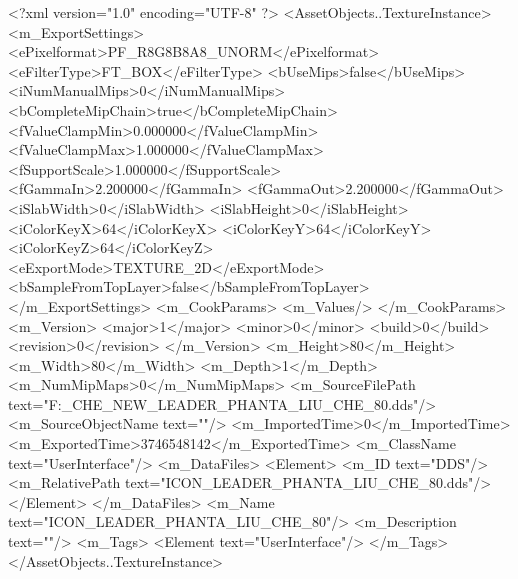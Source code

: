 <?xml version="1.0" encoding="UTF-8" ?>
<AssetObjects..TextureInstance>
	<m_ExportSettings>
		<ePixelformat>PF_R8G8B8A8_UNORM</ePixelformat>
		<eFilterType>FT_BOX</eFilterType>
		<bUseMips>false</bUseMips>
		<iNumManualMips>0</iNumManualMips>
		<bCompleteMipChain>true</bCompleteMipChain>
		<fValueClampMin>0.000000</fValueClampMin>
		<fValueClampMax>1.000000</fValueClampMax>
		<fSupportScale>1.000000</fSupportScale>
		<fGammaIn>2.200000</fGammaIn>
		<fGammaOut>2.200000</fGammaOut>
		<iSlabWidth>0</iSlabWidth>
		<iSlabHeight>0</iSlabHeight>
		<iColorKeyX>64</iColorKeyX>
		<iColorKeyY>64</iColorKeyY>
		<iColorKeyZ>64</iColorKeyZ>
		<eExportMode>TEXTURE_2D</eExportMode>
		<bSampleFromTopLayer>false</bSampleFromTopLayer>
	</m_ExportSettings>
	<m_CookParams>
		<m_Values/>
	</m_CookParams>
	<m_Version>
		<major>1</major>
		<minor>0</minor>
		<build>0</build>
		<revision>0</revision>
	</m_Version>
	<m_Height>80</m_Height>
	<m_Width>80</m_Width>
	<m_Depth>1</m_Depth>
	<m_NumMipMaps>0</m_NumMipMaps>
	<m_SourceFilePath text="F:\MOD\TEMPLATE\LIU_CHE_NEW\ICON_LEADER_PHANTA_LIU_CHE_80.dds"/>
	<m_SourceObjectName text=""/>
	<m_ImportedTime>0</m_ImportedTime>
	<m_ExportedTime>3746548142</m_ExportedTime>
	<m_ClassName text="UserInterface"/>
	<m_DataFiles>
		<Element>
			<m_ID text="DDS"/>
			<m_RelativePath text="ICON_LEADER_PHANTA_LIU_CHE_80.dds"/>
		</Element>
	</m_DataFiles>
	<m_Name text="ICON_LEADER_PHANTA_LIU_CHE_80"/>
	<m_Description text=""/>
	<m_Tags>
		<Element text="UserInterface"/>
	</m_Tags>
</AssetObjects..TextureInstance>

